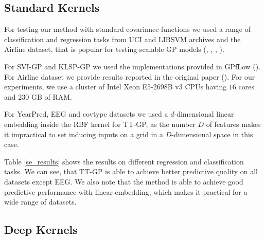 \subsection{Standard Kernels}

For testing our method with standard covariance functions we used a range of
classification and regression tasks from UCI and LIBSVM archives and the
Airline dataset, that is popular for testing scalable GP models
(\citet{hensman2013}, \citet{hensman2015}, \citet{wilson2016stochastic},
\citet{cutajar2016}).

For SVI-GP and KLSP-GP we used the implementations provided in GPfLow
(\citet{GPflow2016}). For Airline dataset we provide results reported in
the original paper (\citet{hensman2015}). For our experiments, we use a cluster of Intel Xeon E5-2698B v3 CPUs having $16$ cores and $230$ GB
of RAM.

For YearPred, EEG and covtype datasets we used a $d$-dimensional linear embedding inside the RBF kernel for TT-GP, as the number $D$ of features makes it
impractical to set inducing inputs on a grid in a $D$-dimensional space in this case.

  

Table \ref{se_results} shows the results on different regression and
classification tasks. We can see, that TT-GP is able to achieve better
predictive quality on all datasets except EEG. We also note that the
method is able to achieve good predictive performance with linear
embedding, which makes it practical for a wide range of datasets.

\subsection{Deep Kernels}

